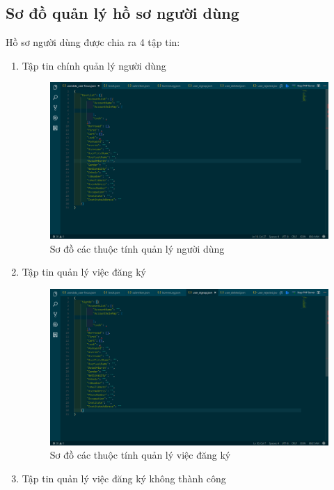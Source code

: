\documentclass[12pt,a4paper]{report}
\begin{document}
		\subsection{Sơ đồ quản lý hồ sơ người dùng}
		Hồ sơ người dùng được chia ra 4 tập tin:
		\begin{enumerate}
			\item Tập tin chính quản lý người dùng
			\begin{figure}[H]
				\centering

				\label{F:userfocus}
				\includegraphics[scale = .3]{userfocus.png}
				\caption{Sơ đồ các thuộc tính quản lý người dùng}
			\end{figure}
			\item Tập tin quản lý việc đăng ký
			\begin{figure}[H]
				\centering

				\label{F:usersignup}
				\includegraphics[scale = .3]{user_signup.png}
				\caption{Sơ đồ các thuộc tính quản lý việc đăng ký}
			\end{figure}
			\item Tập tin quản lý việc đăng ký không thành công
			\begin{figure}[H]
				\centering


\end{figure}
\end{enumerate}
\end{document}
